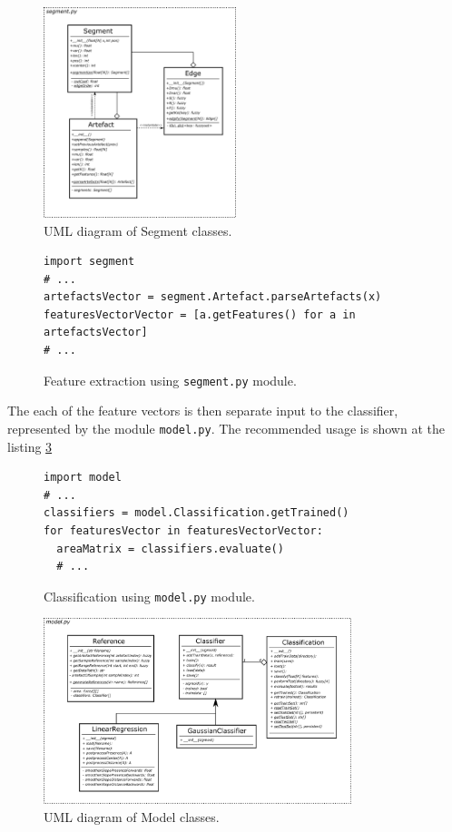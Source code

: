 \begin{figure}[!ht]
\begin{center}
\includegraphics[width=0.5\textwidth]{img/class_segment.png}
\caption{UML diagram of Segment classes. \label{fig:class_segment}}
\end{center}
\end{figure}

\begin{figure}[!ht]
\begin{lstlisting}[style=python]
import segment
# ...
artefactsVector = segment.Artefact.parseArtefacts(x)
featuresVectorVector = [a.getFeatures() for a in artefactsVector]
# ...
\end{lstlisting}
\caption{Feature extraction using \texttt{segment.py} module.\label{listing:featureExtraction}}
\end{figure}


The each of the feature vectors is then separate input to the classifier, represented by the module
\texttt{model.py}. The recommended usage is shown at the listing \ref{listing:classification}

\begin{figure}[!ht]
\begin{lstlisting}[style=python]
import model
# ...
classifiers = model.Classification.getTrained()
for featuresVector in featuresVectorVector:
  areaMatrix = classifiers.evaluate()
  # ...
\end{lstlisting}
\caption{Classification using \texttt{model.py} module.\label{listing:classification}}
\end{figure}

\begin{figure}[!ht]
\begin{center}
\includegraphics[width=0.8\textwidth]{img/class_model.png}
\caption{UML diagram of Model classes. \label{fig:class_model}}
\end{center}
\end{figure}

